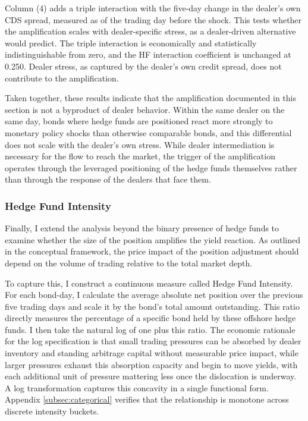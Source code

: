 \documentclass[english, 11pt, oneside]{article}
\begin{document}
Column (4) adds a triple interaction with the five-day change in the dealer's own CDS spread, measured as of the trading day before the shock. This tests whether the amplification scales with dealer-specific stress, as a dealer-driven alternative would predict. The triple interaction is economically and statistically indistinguishable from zero, and the HF interaction coefficient is unchanged at 0.250. Dealer stress, as captured by the dealer's own credit spread, does not contribute to the amplification.

Taken together, these results indicate that the amplification documented in this section is not a byproduct of dealer behavior. Within the same dealer on the same day, bonds where hedge funds are positioned react more strongly to monetary policy shocks than otherwise comparable bonds, and this differential does not scale with the dealer's own stress. While dealer intermediation is necessary for the flow to reach the market, the trigger of the amplification operates through the leveraged positioning of the hedge funds themselves rather than through the response of the dealers that face them.


\subsubsection{Hedge Fund Intensity}
Finally, I extend the analysis beyond the binary presence of hedge funds to examine whether the size of the position amplifies the yield reaction. As outlined in the conceptual framework, the price impact of the position adjustment should depend on the volume of trading relative to the total market depth.

To capture this, I construct a continuous measure called Hedge Fund Intensity. For each bond-day, I calculate the average absolute net position over the previous five trading days and scale it by the bond's total amount outstanding. This ratio directly measures the percentage of a specific bond held by these offshore hedge funds. I then take the natural log of one plus this ratio. The economic rationale for the log specification is that small trading pressures can be absorbed by dealer inventory and standing arbitrage capital without measurable price impact, while larger pressures exhaust this absorption capacity and begin to move yields, with each additional unit of pressure mattering less once the dislocation is underway. A log transformation captures this concavity in a single functional form. Appendix \ref{subsec:categorical} verifies that the relationship is monotone across discrete intensity buckets.
\end{document}
